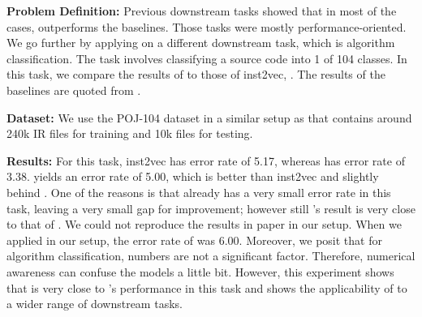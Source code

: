 \textbf{Problem Definition:} Previous downstream tasks showed that in most of the cases, \ourtool outperforms the baselines. Those tasks were mostly performance-oriented. We go further by applying \ourtool on a different downstream task, which is algorithm classification. The task involves classifying a source code into 1 of 104 classes. In this task, we compare the results of \ourtool to those of inst2vec, \programl. The results of the baselines are quoted from \cite{cummins2020programl}.

\textbf{Dataset:} We use the POJ-104 dataset \cite{mou2016convolutional} in a similar setup as \cite{cummins2020programl} that contains around 240k IR files for training and 10k files for testing. 

\textbf{Results:} For this task, inst2vec has error rate of 5.17, whereas \programl has error rate of 3.38. \ourtool yields an error rate of 5.00, which is better than inst2vec and slightly behind \programl. One of the reasons is that \programl already has a very small error rate in this task, leaving a very small gap for improvement; however still \ourtool's result is very close to that of \programl.
We could not reproduce the results in \programl paper in our setup. When we applied \programl in our setup, the error rate of \programl was 6.00.
Moreover, we posit that for algorithm classification, numbers are not a significant factor. Therefore, numerical awareness can confuse the models a little bit.
However, this experiment shows that \ourtool is very close to \programl's performance in this task and shows the applicability of \ourtool to a wider range of downstream tasks.
\vspace{-10pt}

